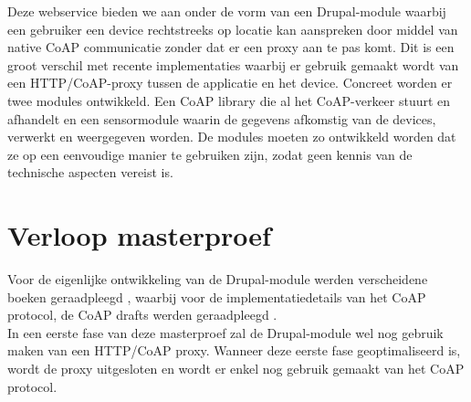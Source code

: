 Deze webservice bieden we aan onder de vorm van een Drupal-module waarbij een gebruiker een device rechtstreeks op locatie kan aanspreken door middel van native CoAP communicatie zonder dat er een proxy aan te pas komt. Dit is een groot verschil met recente implementaties waarbij er gebruik gemaakt wordt van een HTTP/CoAP-proxy tussen de applicatie en het device. Concreet worden er twee modules ontwikkeld. Een CoAP library die al het CoAP-verkeer stuurt en afhandelt en een sensormodule waarin de gegevens afkomstig van de devices, verwerkt en weergegeven worden. De modules moeten zo ontwikkeld worden dat ze op een eenvoudige manier te gebruiken zijn, zodat geen kennis van de technische aspecten vereist is.\\

\section{Verloop masterproef}
Voor de eigenlijke ontwikkeling van de Drupal-module werden verscheidene boeken geraadpleegd \cite{beginDrupal} \cite{proDrupal} \cite{drupalDefGuide}, waarbij voor de implementatiedetails van het CoAP protocol, de CoAP drafts werden geraadpleegd \cite{coapDraft} \cite{coapObserveDraft} \cite{coapConditionalObserveDraft} \cite{coapDiscovery} \cite{blockwiseTransfer} \cite{coreInterfaces}.\\
In een eerste fase van deze masterproef zal de Drupal-module wel nog gebruik maken van een HTTP/CoAP proxy. Wanneer deze eerste fase geoptimaliseerd is, wordt de proxy uitgesloten en wordt er enkel nog gebruik gemaakt van het CoAP protocol.\\

